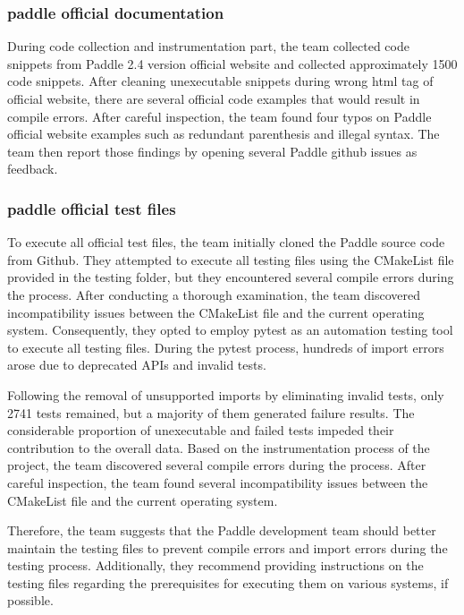 \documentclass[sigconf]{acmart}
\begin{document}
  \subsubsection{paddle official documentation}
  During code collection and instrumentation part, the team collected code snippets from Paddle 2.4 version 
  official website and collected approximately 1500 code snippets. After cleaning unexecutable snippets during wrong 
  html tag of official website, there are several official code examples that would result in compile errors. After careful inspection,
   the team found four typos on Paddle official website examples such as redundant parenthesis and illegal syntax. 
   The team then report those findings by opening several Paddle github issues as feedback.
  \subsubsection{paddle official test files}
  To execute all official test files, the team initially cloned the Paddle source code from Github. They attempted to execute all testing files using the CMakeList file provided in the testing folder, but they encountered several compile errors during the process. After conducting a thorough examination, the team discovered incompatibility issues between the CMakeList file and the current operating system. Consequently, they opted to employ pytest as an automation testing tool to execute all testing files. During the pytest process, hundreds of import errors arose due to deprecated APIs and invalid tests.

  Following the removal of unsupported imports by eliminating invalid tests, only 2741 tests remained, but a majority of them generated failure results. The considerable proportion of unexecutable and failed tests impeded their contribution to the overall data. Based on the instrumentation process of the project, the team discovered several compile errors during the process. After careful inspection, the team found several incompatibility issues between the CMakeList file and the current operating system.

  Therefore, the team suggests that the Paddle development team should better maintain the testing files to prevent compile errors and import errors during the testing process. Additionally, they recommend providing instructions on the testing files regarding the prerequisites for executing them on various systems, if possible.
  
\end{document}
